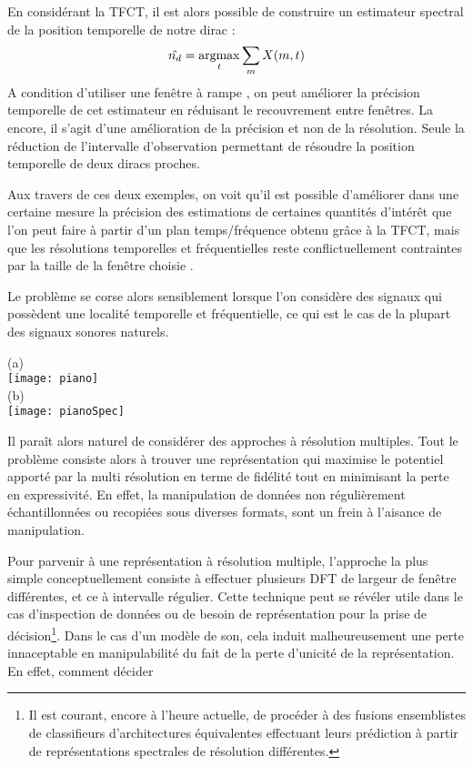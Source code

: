 En considérant la TFCT, il est alors possible de construire un estimateur \og spectral \fg de la position temporelle de notre dirac :
\begin{equation}
\hat{n_d} = \operatorname*{argmax}_t \sum_m X(m, t)
\end{equation}
A condition d'utiliser une fenêtre \fg à rampe \og, on peut améliorer la précision temporelle de cet estimateur en réduisant le recouvrement entre fenêtres. La encore, il s'agit d'une amélioration de la précision et non de la résolution. Seule la réduction de l'intervalle d'observation permettant de résoudre la position temporelle de deux diracs proches.

Aux travers de ces deux exemples, on voit qu'il est possible d'améliorer dans une certaine mesure la précision des estimations de certaines quantités d'intérêt que l'on peut faire à partir d'un plan temps/fréquence obtenu grâce à la TFCT, mais que les résolutions temporelles et fréquentielles reste conflictuellement contraintes par la taille de la fenêtre choisie .

Le problème se corse alors sensiblement lorsque l'on considère des signaux qui possèdent une localité temporelle et fréquentielle, ce qui est le cas de la plupart des signaux sonores naturels.

\begin{marginfigure}
  (a) \\
  \texttt{[image: piano]} \\
  (b) \\
  \texttt{[image: pianoSpec]}
  \caption{Signal temporel (a) et spectrogramme (b) d'une note de piano.}
\end{marginfigure}

Il paraît alors naturel de considérer des approches à résolution multiples. Tout le problème consiste alors à trouver une représentation qui maximise le potentiel apporté par la multi résolution en terme de fidélité tout en minimisant la perte en expressivité. En effet, la manipulation de données non régulièrement échantillonnées ou recopiées sous diverses formats, sont un frein à l'aisance de manipulation.

Pour parvenir à une représentation à résolution multiple, l'approche la plus simple conceptuellement consiste à \og effectuer \fg plusieurs DFT de largeur de fenêtre différentes, et ce à intervalle régulier. Cette technique peut se révéler utile dans le cas d'inspection de données ou de besoin de représentation pour la prise de décision\footnote{Il est courant, encore à l'heure actuelle, de procéder à des fusions ensemblistes de classifieurs d'architectures équivalentes effectuant leurs prédiction à partir de représentations spectrales de résolution différentes.}. Dans le cas d'un modèle de son, cela induit malheureusement une perte innaceptable en manipulabilité du fait de la perte d'unicité de la représentation. En effet, comment décider

